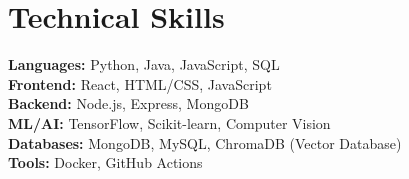 \documentclass[letterpaper,10pt]{article}
\begin{document}
\section{Technical Skills}
 \begin{itemize}[leftmargin=0.1in, label={}]
    \small{\item{
     \textbf{Languages:} Python, Java, JavaScript, SQL \\
    \textbf{Frontend:} React, HTML/CSS, JavaScript \\
    \textbf{Backend:} Node.js, Express, MongoDB\\
    \textbf{ML/AI:} TensorFlow, Scikit-learn, Computer Vision \\
    \textbf{Databases:} MongoDB, MySQL, ChromaDB (Vector Database) \\
    \textbf{Tools:} Docker, GitHub Actions
    }}
 \end{itemize}
\end{document}
